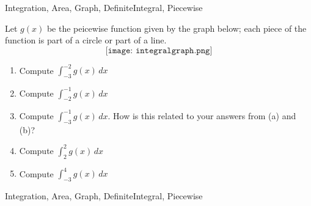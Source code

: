 \begin{tagblock}{Integration, Area, Graph, DefiniteIntegral, Piecewise}
\begin{question}

Let $g(x)$ be the peicewise function given by the graph below; each piece of the function is part of a circle or part of a line.
\[ \texttt{[image: integralgraph.png]}\]

\begin{enumerate}
\item Compute $\displaystyle \int_{-3}^{-2} g(x) \, dx$
\vspace{1in}
\item Compute $\displaystyle \int_{-2}^{-1} g(x) \, dx$
\vspace{1in}
\item Compute $\displaystyle \int_{-3}^{-1} g(x) \, dx$.  How is this related to your answers from (a) and (b)?
\vspace{1in}
\item Compute $\displaystyle \int_{2}^{2} g(x) \, dx$
\vspace{.5in}
\item Compute $\displaystyle \int_{-3}^{4} g(x) \, dx$ 

\end{enumerate}




	
	
\begin{tags}
	   Integration, Area, Graph, DefiniteIntegral, Piecewise
\end{tags}
	
\begin{diary}
\end{diary}
	
\begin{solution}
	   
	    \end{enumerate}
\end{solution}
	
\end{question}

\end{tagblock}


